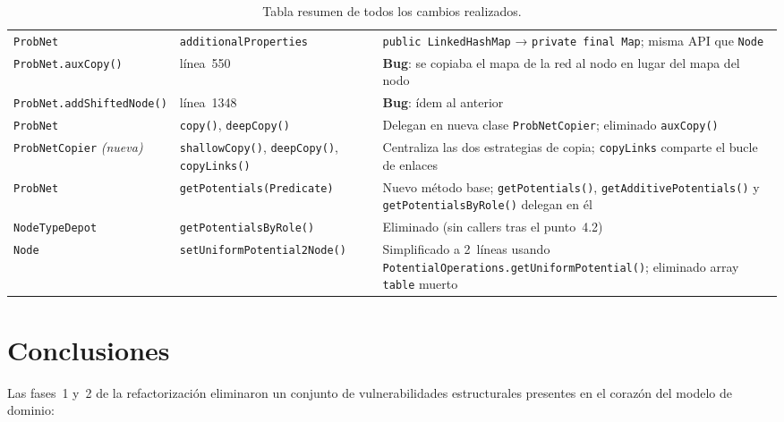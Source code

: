 \documentclass[11pt,a4paper]{article}
\newcommand{\code}[1]{\texttt{#1}}
\begin{document}
\begin{table}[!htbp]
\begin{tabular}{p{4.5cm} p{3.5cm} p{6cm}}
\addlinespace
\code{ProbNet}
  & \code{additionalProperties}
  & \code{public LinkedHashMap} → \code{private final Map}; misma API que \code{Node} \\
\addlinespace
\code{ProbNet.auxCopy()}
  & línea~550
  & \textbf{Bug}: se copiaba el mapa de la red al nodo en lugar del mapa del nodo \\
\addlinespace
\code{ProbNet.addShiftedNode()}
  & línea~1348
  & \textbf{Bug}: ídem al anterior \\
\addlinespace
\code{ProbNet}
  & \code{copy()}, \code{deepCopy()}
  & Delegan en nueva clase \code{ProbNetCopier}; eliminado \code{auxCopy()} \\
\addlinespace
\code{ProbNetCopier} \emph{(nueva)}
  & \code{shallowCopy()}, \code{deepCopy()}, \code{copyLinks()}
  & Centraliza las dos estrategias de copia; \code{copyLinks} comparte el bucle de enlaces \\
\addlinespace
\code{ProbNet}
  & \code{getPotentials(Predicate)}
  & Nuevo método base; \code{getPotentials()}, \code{getAdditivePotentials()} y \code{getPotentialsByRole()} delegan en él \\
\addlinespace
\code{NodeTypeDepot}
  & \code{getPotentialsByRole()}
  & Eliminado (sin callers tras el punto~4.2) \\
\addlinespace
\code{Node}
  & \code{setUniformPotential2Node()}
  & Simplificado a 2~líneas usando \code{PotentialOperations.getUniformPotential()}; eliminado array \code{table} muerto \\
\bottomrule
\end{tabular}
\caption{Tabla resumen de todos los cambios realizados.}
\end{table}

\section{Conclusiones}

Las fases~1 y~2 de la refactorización eliminaron un conjunto de
vulnerabilidades estructurales presentes en el corazón del modelo de dominio:
\end{document}
